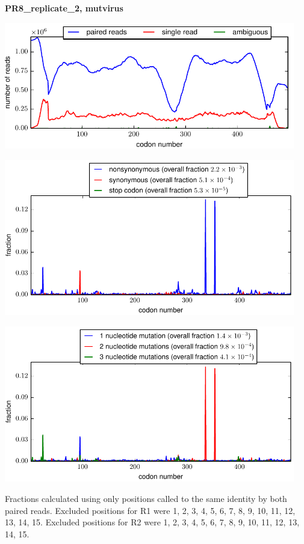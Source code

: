 \documentclass[10pt,letterpaper]{article}
\begin{document}
\centerline{\Large \bf PR8\_replicate\_2, mutvirus}
\vspace{0.1in}

\centerline{\includegraphics[width=5in]{PR8_replicate_2_mutvirus_codondepth.pdf}}
\vspace{0.1in}

\centerline{\includegraphics[width=5in]{PR8_replicate_2_mutvirus_syn-ns-dist.pdf}}
\vspace{0.1in}

\centerline{\includegraphics[width=5in]{PR8_replicate_2_mutvirus_nmutspercodon-dist.pdf}}
\vspace{0.1in}

Fractions calculated using only positions called to the same identity by both paired reads.  Excluded positions for R1 were 1, 2, 3, 4, 5, 6, 7, 8, 9, 10, 11, 12, 13, 14, 15. 
 Excluded positions for R2 were 1, 2, 3, 4, 5, 6, 7, 8, 9, 10, 11, 12, 13, 14, 15. 
\end{document}
